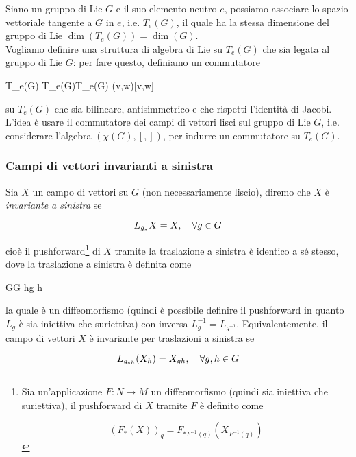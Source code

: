 Siano un gruppo di Lie $ G $ e il suo elemento neutro $ e $, possiamo associare lo spazio vettoriale tangente a $ G $ in $ e $, i.e. $ T_{e}(G) $, il quale ha la stessa dimensione del gruppo di Lie $ \dim(T_{e}(G)) = \dim(G) $.\\
Vogliamo definire una struttura di algebra di Lie su $ T_{e}(G) $ che sia legata al gruppo di Lie $ G $: per fare questo, definiamo un commutatore

\map{[,]}%
	{T_{e}(G) \times T_{e}(G)}{T_{e}(G)}%
	{(v,w)}{[v,w]}

su $ T_{e}(G) $ che sia bilineare, antisimmetrico e che rispetti l'identità di Jacobi.\\
L'idea è usare il commutatore dei campi di vettori lisci sul gruppo di Lie $ G $, i.e. considerare l'algebra $ (\chi(G),[,]) $, per indurre un commutatore su $ T_{e}(G) $.

\subsubsection{Campi di vettori invarianti a sinistra}

Sia $ X $ un campo di vettori su $ G $ (non necessariamente liscio), diremo che $ X $ è \textit{invariante a sinistra} se

\begin{equation}
	L_{g_{*}} X = X \qcomma \forall g \in G
\end{equation}

cioè il pushforward\footnote{%
	Sia un'applicazione $ F : N \to M $ un diffeomorfismo (quindi sia iniettiva che suriettiva), il pushforward di $ X $ tramite $ F $ è definito come

	\begin{equation*}
		(F_{*} (X))_{q} = F_{*F^{-1}(q)} (X_{F^{-1}(q)})
	\end{equation*}%
} di $ X $ tramite la traslazione a sinistra è identico a sé stesso, dove la traslazione a sinistra è definita come

%
	{G}{G}%
	{h}{g h}

la quale è un diffeomorfismo (quindi è possibile definire il pushforward in quanto $ L_{g} $ è sia iniettiva che suriettiva) con inversa $ L_{g}^{-1} = L_{g^{-1}} $. Equivalentemente, il campo di vettori $ X $ è invariante per traslazioni a sinistra se

\begin{equation}
	L_{g_{*h}} (X_{h}) = X_{gh} \qcomma \forall g,h \in G
\end{equation}

